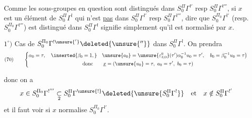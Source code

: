 Comme les sous-groupes en question sont distingués dans
$S_0^{\Pi}\Gamma^{!'}$ resp $S_0^{\Pi}\Gamma^{!'''}$, 
si $x$ est un élément de $S_0^{\Pi}\Gamma^{!}$ qui n'est
\uline{pas} dans $S_0^{\Pi}\Gamma^{!'}$ resp $S_0^{\Pi}\Gamma^{!'''}$,
dire que $S_0^{\Pi_0}\Gamma^{!'}$ (resp. $S_0^{\Pi_0}\Gamma^{!'''}$)
est distingué dans $S_0^{\Pi}\Gamma^{!}$  signifie simplement
qu'il est normalisé par $x$.

$1^\circ)$ Cas de $S_0^{\Pi_0}\Gamma^{!\unsure{'}}\deleted{\unsure{''}}$
dans $S_0^{\Pi}\Gamma^{!}$. On prendra
\[
(70)\qquad
\left\{
\begin{gathered}
\alpha_0=\tau,\quad \inserted{\beta_0=1,}\quad
\unsure{a_0}=\unsure{\varepsilon^0_{3,0}}(\tau')\alpha_0^{-1}u_0=\tau',
\quad b_0=\beta_0^{-1}u_0=\tau\big)\\
\text{donc}\qquad
\underline{x}=(\unsure{u_0}=\tau,\ a_0=\tau',\ b_0=\tau)
\end{gathered}
\right.
\]



donc on a
\[
x\in S_0^{\Pi_0}\Gamma^{!'''}
\underset{2}{\subset}S_0^{\Pi}\Gamma^{\unsure{!}}
\deleted{\unsure{S_0^{\Pi}\Gamma^{!}}}
\quad\text{et}\quad x\notin S_0^{\Pi}\Gamma^{!'}
\]
et il faut voir si $x$ normalise $S_0^{\Pi_0}\Gamma^{!'}$.

